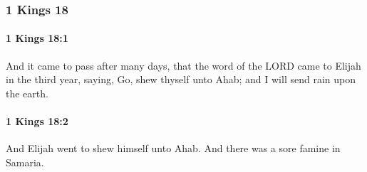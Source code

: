	\subsubsection{1 Kings 18} %
		\label{1KINGS-18}

		\paragraph{1 Kings 18:1} %
			\label{1KINGS-18-1}

			And it came to pass after many days, that the word of the LORD came to Elijah in the third year, saying, Go, shew thyself unto Ahab; and I will send rain upon the earth.


		\paragraph{1 Kings 18:2} %
			\label{1KINGS-18-2}

			And Elijah went to shew himself unto Ahab. And there was a sore famine in Samaria.

